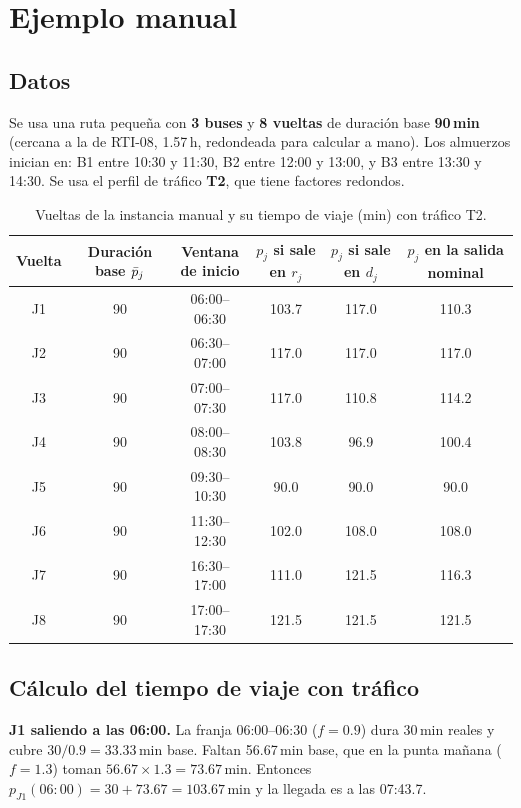 \section{Ejemplo manual}\label{sec:manual}

\subsection{Datos}
Se usa una ruta pequeña con \textbf{3 buses} y \textbf{8 vueltas} de duración base \textbf{90\,min} (cercana a la de RTI-08, 1.57\,h, redondeada para calcular a mano). Los almuerzos inician en: B1 entre 10:30 y 11:30, B2 entre 12:00 y 13:00, y B3 entre 13:30 y 14:30. Se usa el perfil de tráfico \textbf{T2}, que tiene factores redondos.

\begin{table}[H]
\centering\small
\caption{Vueltas de la instancia manual y su tiempo de viaje (min) con tráfico T2.}\label{tab:manual-datos}
\begin{tabular}{cccccc}
\toprule
Vuelta & \makecell{Duración\\base $\bar{p}_j$} & \makecell{Ventana\\de inicio} & \makecell{$p_j$ si sale\\en $r_j$} & \makecell{$p_j$ si sale\\en $d_j$} & \makecell{$p_j$ en la\\salida nominal} \\
\midrule
J1 & 90 & 06:00--06:30 & 103.7 & 117.0 & 110.3 \\
J2 & 90 & 06:30--07:00 & 117.0 & 117.0 & 117.0 \\
J3 & 90 & 07:00--07:30 & 117.0 & 110.8 & 114.2 \\
J4 & 90 & 08:00--08:30 & 103.8 & 96.9 & 100.4 \\
J5 & 90 & 09:30--10:30 & 90.0 & 90.0 & 90.0 \\
J6 & 90 & 11:30--12:30 & 102.0 & 108.0 & 108.0 \\
J7 & 90 & 16:30--17:00 & 111.0 & 121.5 & 116.3 \\
J8 & 90 & 17:00--17:30 & 121.5 & 121.5 & 121.5 \\
\bottomrule
\end{tabular}
\end{table}

\subsection{Cálculo del tiempo de viaje con tráfico}
\textbf{J1 saliendo a las 06:00.} La franja 06:00--06:30 ($f = 0.9$) dura 30\,min reales y cubre $30/0.9 = 33.33$\,min base. Faltan 56.67\,min base, que en la punta mañana ($f = 1.3$) toman $56.67 \times 1.3 = 73.67$\,min. Entonces $p_{J1}(06{:}00) = 30 + 73.67 = \mathbf{103.67}$\,min y la llegada es a las 07:43.7.

